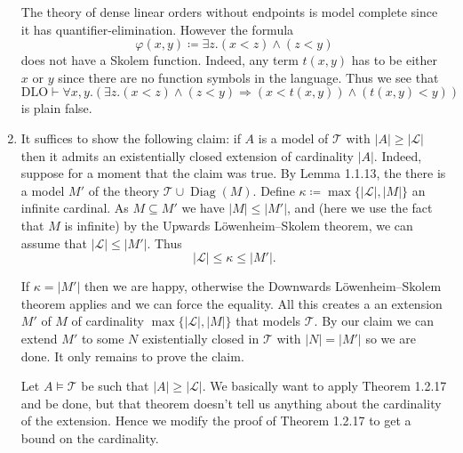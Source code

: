\documentclass{article}
\DeclareMathOperator{\Diag}{Diag}
\begin{document}
\begin{enumerate}[leftmargin=*]
		The theory of dense linear orders without endpoints is model complete since it has quantifier-elimination. However the formula
		\[
			\varphi(x,y) \coloneqq \exists z. (x < z) \wedge (z < y)
		\]
		does not have a Skolem function. Indeed, any term $t(x,y)$ has to be either $x$ or $y$ since there are no function symbols in the language. Thus we see that 
		\[
			\text{DLO} \vdash \forall x,y. (\exists z. (x < z) \wedge (z < y) \Rightarrow (x < t(x,y)) \wedge (t(x,y) < y))
		\]
		is plain false.
		\item It suffices to show the following claim: if $A$ is a model of $\mathcal{T}$ with $|A| \geq |\mathcal{L}|$ then it admits an existentially closed extension of cardinality $|A|$. Indeed, suppose for a moment that the claim was true. By Lemma 1.1.13, the there is a model $M'$ of the theory $\mathcal{T} \cup \Diag(M)$. Define $\kappa \coloneqq \max\{|\mathcal{L}|,|M|\}$ an infinite cardinal. As $M\subseteq M'$ we have $|M|\leq |M'|$, and  (here we use the fact that $M$ is infinite) by the Upwards Löwenheim–Skolem theorem, we can assume that $|\mathcal{L}|\leq |M'|$. Thus 
		\[
			|\mathcal{L}| \leq \kappa \leq |M'|.
		\]
		
		If $\kappa = |M'|$ then we are happy, otherwise the Downwards Löwenheim–Skolem theorem applies and we can force the equality. All this creates a an extension $M'$ of $M$ of cardinality $\max\{|\mathcal{L}|,|M|\}$ that models $\mathcal{T}$. By our claim we can extend $M'$ to some $N$ existentially closed in $\mathcal{T}$ with $|N| = |M'|$ so we are done. It only remains to prove the claim.
		
		Let $A\models \mathcal{T}$ be such that $|A|\geq |\mathcal{L}|$. We basically want to apply Theorem 1.2.17 and be done, but that theorem doesn't tell us anything about the cardinality of the extension. Hence we modify the proof of Theorem 1.2.17 to get a bound on the cardinality.
		

\end{enumerate}
\end{document}
